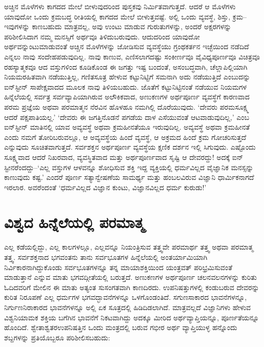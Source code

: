 ಅಚ್ಚಿನ ಮೊಳೆಗಳು ಕಾಗದದ ಮೇಲೆ ಬೀಳುವುದರಿಂದ ಪುಸ್ತಕವು ನಿರ್ಮಿತವಾಗುತ್ತದೆ. ಆದರೆ ಆ ಮೊಳೆಗಳು ಯಾವುದೋ ಒಂದು ಕ್ರಮಬದ್ಧ ರೀತಿಯಲ್ಲಿ ಕಾಗದದ ಮೇಲೆ ಬೀಳುತ್ತವಷ್ಟೆ. ಅಲ್ಲಿ ಒಂದು ವ್ಯವಸ್ಥೆ, ಶಿಸ್ತು, ಕ್ರಮ–ಇವುಗಳನ್ನು ಕಾಣಬಹುದು ಮಾತ್ರವಲ್ಲ, ಅವು ಉಂಟು ಮಾಡುವ ಗುರುತುಗಳನ್ನು, ಅಂದರೆ ಅಕ್ಷರಗಳನ್ನು ಪರಿಶೀಲಿಸಿದಾಗ ನಮ್ಮ ಮನಸ್ಸಿಗೆ ಅರ್ಥವೂ ತಿಳಿದುಬರುವುದು. ಆದುದರಿಂದ ಯಾವುದೋ ಅರ್ಥವನ್ನುಂಟುಮಾಡುವಂತೆ ಅಚ್ಚಿನ ಮೊಳೆಗಳನ್ನು ಜೋಡಿಸುವ ವ್ಯವಸ್ಥೆಯು ಗ್ರಂಥಕರ್ತನ ಇಚ್ಛೆಯಿಂದ ನಡೆದಿದೆ ಎನ್ನಲು ನಾವು ಸಂದೇಹಪಡುವುದಿಲ್ಲ. ನಾವು ಕಾಣುವ, ಎಣಿಸಲಾಗದಷ್ಟು ಸಂಕೀರ್ಣವೂ ವೈವಿಧ್ಯಪೂರ್ಣವೂ ವಿಚಿತ್ರವೂ ರಹಸ್ಯಾತ್ಮಕವೂ ಆದ ವಸ್ತುಗಳಿಂದ ಕೂಡಿಕೊಂಡ ಈ ಜಗತ್ತು ಇಷ್ಟ ಬಂದಂತೆ, ಅಸಂಬದ್ಧವಾಗಿ, ಚೆಲ್ಲಾಪಿಲ್ಲಿಯಾಗಿ ನಿಯಮರಹಿತವಾಗಿ ನಡೆಯುತ್ತಿಲ್ಲ, ಗಣಿತಸೂತ್ರ ಹೇಳುವ ಕಟ್ಟುನಿಟ್ಟಿಗೆ ಸಮನಾಗಿ ಅದು ನಡೆಯುತ್ತಿದೆ ಎಂಬುದನ್ನು ಐನ್​ಸ್ಟೀನ್ ಸಾಪೇಕ್ಷವಾದದ ಮೂಲಕ ನಾವು ತಿಳಿಯಬಹುದು. ಜೊತೆಗೆ ಕಟ್ಟುನಿಟ್ಟಿನಂತೆ ನಡೆಯುವ ನಿಯಮಗಳ ಹಿನ್ನೆಲೆಯಲ್ಲಿ ಸರ್ವತ್ರ ಸರ್ವವ್ಯಾಪಿಯಾಗಿರುವ ಅಲೌಕಿಕವಾದ, ಅಣುಕಣಗಳ ಅರ್ಥಪೂರ್ಣ ವ್ಯವಸ್ಥೆಗೆ ಕಾರಣವಾದ ಪರಮ ಪ್ರಜ್ಞೆಯ ಅಥವಾ ಪರಮಾತ್ಮನ ನೆರವಿನ ಹೊಳಹೂ ನಮಗಿಲ್ಲಿ ದೊರೆಯುವುದು. ‘ದೇವರು ಪರಮಸೂಕ್ಷ್ಮ ಆದರೆ ಪಕ್ಷಪಾತಿಯಲ್ಲ.’ ‘ದೇವರು ಈ ಜಗತ್ತಿನೊಡನೆ ಪಗಡೆಯ ದಾಳ ಎಸೆಯುವಂತೆ ಆಟವಾಡುವುದಿಲ್ಲ,’ ಎಂಬ ಐನ್​ಸ್ಟೀನ್ ಮಾತಿನಲ್ಲಿ ಯಾವ ಅವ್ಯವಸ್ಥೆ ಅಥವಾ ಕ್ರಮಹೀನತೆಯೂ ಇರುವುದಿಲ್ಲ. ಅವ್ಯವಸ್ಥೆ ಅಥವಾ ಕ್ರಮಹೀನತೆ ಎಂದು ನಮಗೆ ತೋರಿಬರುವಲ್ಲೂ, ಆ ಅವ್ಯವಸ್ಥೆಯ ಹಿಂದೆ ವ್ಯವಸ್ಥೆ, ಆ ಅಕ್ರಮದ ಹಿಂದೆ ಕ್ರಮ ಗೋಚರಿಸುತ್ತದೆ ಎನ್ನುವುದು ಸೂಚಿತವಾಗುತ್ತದೆ. ಸರ್ವಶಕ್ತನ ಅರ್ಥಪೂರ್ಣ ವ್ಯವಸ್ಥೆಯ ಕ್ಷಣಿಕ ದರ್ಶನ ಇಲ್ಲಿ ಸಿಗುವುದು. ಎಷ್ಟೊಂದು ಸೂಕ್ಷ್ಮವಾದ ಆದರೆ ನಿಖರವಾದ, ವ್ಯವಸ್ಥಿತವಾದ ಮತ್ತು ಅರ್ಥಪೂರ್ಣವಾದ ಸೃಷ್ಟಿ ಆ ದೇವರದ್ದು! ಅದಕ್ಕೆ ಐನ್​ಸ್ಟೀನರೆಂದದ್ದು–‘ಎಲ್ಲ ವಸ್ತುಗಳ ಆಳವನ್ನೂ ಶೋಧಿಸುವ ಶಕ್ತಿ ಇದ್ದ ವ್ಯಕ್ತಿಯಲ್ಲಿ ಧರ್ಮವಿಲ್ಲದ ವೈಜ್ಞಾನಿಕ ಮನಸ್ಸನ್ನು ಕಾಣುವುದು ಕಷ್ಟ.’ ಎಂದರೆ ಪೂರ್ಣ ಸತ್ಯಾನ್ವೇಷಣೆಯ ಸಾಮರ್ಥ್ಯ ಮತ್ತು ಹಂಬಲವಿರುವ ವಿಜ್ಞಾನಿ ಧಾರ್ಮಿಕನಾಗದೆ ಇರಲಾರ. ಅವರೆಂದಂತೆ ‘ಧರ್ಮವಿಲ್ಲದ ವಿಜ್ಞಾನ ಕುಂಟು, ವಿಜ್ಞಾನವಿಲ್ಲದ ಧರ್ಮ ಕುರುಡು!’


\section*{ವಿಶ್ವದ ಹಿನ್ನೆಲೆಯಲ್ಲಿ ಪರಮಾತ್ಮ}


ಎಲ್ಲ ಕಡೆಯಲ್ಲಿದ್ದು, ಎಲ್ಲ ಕಾಲಗಳಲ್ಲೂ, ಎಲ್ಲವನ್ನೂ ನಿಯಂತ್ರಿಸುವ ತತ್ತ್ವವೇ ಪರಮಾರ್ಥ ತತ್ತ್ವ ಅಥವಾ ಪರಮಾತ್ಮ ತತ್ತ್ವ. ಸರ್ವಶಕ್ತನಾದ ಭಗವಂತನು ತಾನು ಸರ್ವಭೂತಗಳ ಹಿನ್ನೆಲೆಯಲ್ಲಿ ಅಂತರ್ಯಾಮಿಯಾಗಿ ನಿರ್ವಿಕಾರನಾಗಿದ್ದುಕೊಂಡು ಸರ್ವಭೂತಗಳನ್ನೂ ತನ್ನ ಮಾಯಾ\-ಶಕ್ತಿ\-ಯಿಂದ ಯಂತ್ರವತ್ ಪರಿಭ್ರಮಿಸುವಂತೆ ಮಾಡುತ್ತಾನೆ ಎನ್ನುವ ಮಾತು ಭಗವದ್ಗೀತೆಯಲ್ಲಿ ಬರುತ್ತದೆ. ಅಣುಕಣಗಳ ಅರ್ಥಪೂರ್ಣ ಚಲನವಲನಗಳನ್ನು ಕುರಿತು ಓದಿದವರಿಗೆ ಮೇಲಿನ ಈ ಮಾತು ಅತ್ಯಂತ ಸುಸಂಗತವಾಗಿ ಕಾಣದಿರದು. ಉಪನಿಷತ್ತುಗಳಲ್ಲಿ ಕಂಡುಬರುವ ದೇವರನ್ನು ಕುರಿತ ನಿರೂಪಣೆ ಎಲ್ಲ ಧರ್ಮಗಳ ಭಗವದ್ಭಾವನೆಗಳನ್ನೂ ಒಳಗೊಂಡಂತಿದೆ. ಸಗುಣಸಾಕಾರದ ಭಾವನೆಗಳನ್ನೂ, ನಿರ್ಗುಣನಿರಾಕಾರದ ಭಾವನೆಗಳನ್ನೂ ಅಲ್ಲಿ ಏಕ ಸೂತ್ರದಲ್ಲಿ ಹಿಡಿದಿಡಲಾಗಿದೆ. ಮಾತ್ರವಲ್ಲದೆ ವಿಜ್ಞಾನಿಗಳು ಹೇಳುವ ವಿಶ್ವನಿಯಾಮಕ ಶಕ್ತಿಯ ಬಗೆಗಿನ ಭಾವನೆಗೆ ನಿಕಟವಾಗಿದ್ದು ಅದಕ್ಕೂ ಮೀರಿದ ಅರ್ಥವ್ಯಾಪ್ತಿಯನ್ನೂ, ಪೂರ್ಣತೆಯನ್ನೂ ಹೊಂದಿದೆ. ಶ್ವೇತಾಶ್ವತರ\break ಉಪನಿಷತ್ತಿನ  ಒಂದು ಮಂತ್ರದಲ್ಲಿ ಬರುವ ಗಭೀರ ಅರ್ಥ ವ್ಯಾಪ್ತಿಯುಳ್ಳ ಹನ್ನೊಂದು ಶಬ್ದಗಳನ್ನು ಪ್ರತಿಯೊಬ್ಬರೂ ಪರಿಶೀಲಿಸಬಹುದು:

